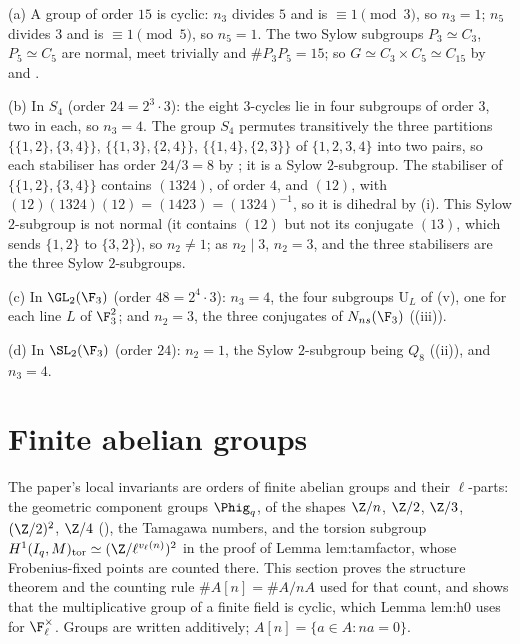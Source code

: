 \begin{example}\label{ex:groups:sylowsmall}
(a) A group of order $15$ is cyclic: $n_3$ divides $5$ and is $\equiv1\pmod3$, so $n_3=1$; $n_5$ divides $3$ and is $\equiv1\pmod5$, so $n_5=1$. The two
Sylow subgroups $P_3\simeq C_3$, $P_5\simeq C_5$ are normal, meet trivially and $\#P_3P_5=15$; so $G\simeq C_3\times C_5\simeq C_{15}$ by
 and .

(b) In $S_4$ (order $24=2^3\cdot3$): the eight $3$-cycles lie in four subgroups of order $3$, two in each, so $n_3=4$. The group $S_4$ permutes
transitively the three partitions $\{\{1,2\},\{3,4\}\}$, $\{\{1,3\},\{2,4\}\}$, $\{\{1,4\},\{2,3\}\}$ of $\{1,2,3,4\}$ into two pairs, so each stabiliser has order
$24/3=8$ by ; it is a Sylow $2$-subgroup. The stabiliser of $\{\{1,2\},\{3,4\}\}$ contains $(1324)$, of order $4$, and $(12)$, with
$(12)(1324)(12)=(1423)=(1324)^{-1}$, so it is dihedral by (i). This Sylow $2$-subgroup is not normal (it contains $(12)$
but not its conjugate $(13)$, which sends $\{1,2\}$ to $\{3,2\}$), so $n_2\ne1$; as $n_2\mid3$, $n_2=3$, and the three stabilisers are the three Sylow $2$-subgroups.

(c) In $\GL_2(\F_3)$ (order $48=2^4\cdot3$): $n_3=4$, the four subgroups $\mathrm U_L$ of (v), one for each line $L$ of $\F_3^2$; and
$n_2=3$, the three conjugates of $N_{ns}(\F_3)$ ((iii)).

(d) In $\SL_2(\F_3)$ (order $24$): $n_2=1$, the Sylow $2$-subgroup being $Q_8$ ((ii)), and $n_3=4$.
\end{example}

\section{Finite abelian groups}\label{sec:groups:abelian}

The paper's local invariants are orders of finite abelian groups and their $\ell$-parts: the geometric component groups $\Phig_q$, of the
shapes $\Z/n$, $\Z/2$, $\Z/3$, $(\Z/2)^2$, $\Z/4$ (), the Tamagawa numbers, and the torsion subgroup
$H^1(I_q,M)_{\mathrm{tor}}\simeq(\Z/\ell^{v_\ell(n)})^2$ in the proof of Lemma lem:tamfactor, whose Frobenius-fixed points are counted there.
This section proves the structure theorem and the counting rule $\#A[n]=\#A/nA$ used for that count, and shows that the multiplicative group of
a finite field is cyclic, which Lemma lem:h0 uses for $\F_\ell^\times$. Groups are written additively; $A[n]=\{a\in A:na=0\}$.

